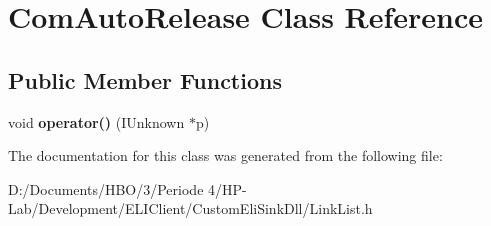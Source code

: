 \hypertarget{class_com_auto_release}{}\section{Com\+Auto\+Release Class Reference}
\label{class_com_auto_release}
\subsection*{Public Member Functions}
\begin{DoxyCompactItemize}
\item 
\mbox{\label{class_com_auto_release_a736329d817263e68fdc082ae0a9406cc}} 
void {\bfseries operator()} (I\+Unknown $\ast$p)
\end{DoxyCompactItemize}


The documentation for this class was generated from the following file\+:\begin{DoxyCompactItemize}
\item 
D\+:/\+Documents/\+H\+B\+O/3/\+Periode 4/\+H\+P-\/\+Lab/\+Development/\+E\+L\+I\+Client/\+Custom\+Eli\+Sink\+Dll/Link\+List.\+h\end{DoxyCompactItemize}
